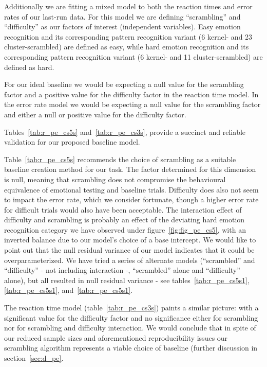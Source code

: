 	    Additionally we are fitting a mixed model to both the reaction times and error rates of our last-run data.
	    For this model we are defining “scrambling” and “difficulty” as our factors of interest (independent variables).
	    Easy emotion recognition and its corresponding pattern recognition variant (\SI{6}{\pixel} kernel- and \SI{23}{\pixel} cluster-scrambled) are defined as easy,
	    while hard emotion recognition and its corresponding pattern recognition variant (\SI{6}{\pixel} kernel- and \SI{11}{\pixel} cluster-scrambled) are defined as hard.
	    
	    For our ideal baseline we would be expecting a null value for the scrambling factor and a positive value for the difficulty factor in the reaction time model.
	    In the error rate model we would be expecting a null value for the scrambling factor and either a null or positive value for the difficulty factor.
	    
	    Tables~\ref{tab:r_pe_cs5s} and~\ref{tab:r_pe_cs3s}, provide a succinct and reliable validation for our proposed baseline model.
	    
	    Table~\ref{tab:r_pe_cs5s} recommends the choice of scrambling as a suitable baseline creation method for our task.
	    The factor determined for this dimension is null, meaning that scrambling does not compromise the behavioural equivalence of emotional testing and baseline trials.
	    Difficulty does also not seem to impact the error rate, which we consider fortunate, though a higher error rate for difficult trials would also have been acceptable.
	    The interaction effect of difficulty and scrambling is probably an effect of the deviating hard emotion recognition category we have observed under figure~\ref{fig:fig_pe_cs5}, with an inverted balance due to our model's choice of a base intercept.
	    We would like to point out that the null residual variance of our model indicates that it could be overparameterized.
	    We have tried a series of alternate models (“scrambled” and “difficulty” - not including interaction -, “scrambled” alone and “difficulty” alone), but all resulted in null residual variance - 
	    see tables~\ref{tab:r_pe_cs5s1}, \ref{tab:r_pe_cs5s1}, and~\ref{tab:r_pe_cs5s1}.
	    
	    The reaction time model (table~\ref{tab:r_pe_cs3s}) paints a similar picture: with a significant value for the difficulty factor and no significance either for scrambling nor for scrambling and difficulty interaction.
	    We would conclude that in spite of our reduced sample sizes and aforementioned reproducibility issues our scrambling algorithm represents a viable choice of baseline (further discussion in section~\ref{sec:d_pe}.
	    
